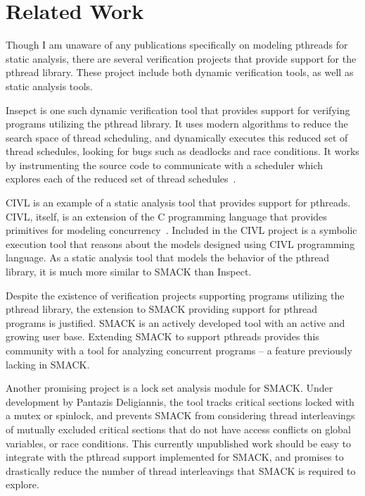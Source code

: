 \chapter{Related Work}\label{thesis_relatedwork}
Though I am unaware of any publications specifically on modeling
pthreads for static analysis, there are several verification projects
that provide support for the pthread library.  These project include
both dynamic verification tools, as well as static analysis tools.

Insepct is one such dynamic verification tool that provides support
for verifying programs utilizing the pthread library.  It uses modern 
algorithms to reduce the search space of thread scheduling, and
dynamically executes this reduced set of thread schedules, looking for
bugs such as deadlocks and race conditions.  It works by instrumenting
the source code to communicate with a scheduler which explores each of
the reduced set of thread schedules~\cite{inspect}.

CIVL is an example of a static analysis tool that provides support for
pthreads.  CIVL, itself, is an extension of the C programming
language that provides primitives for modeling
concurrency~\cite{civl}.  Included in the CIVL project is a symbolic
execution tool that reasons about the models designed using CIVL
programming language.  As a static analysis tool that models the
behavior of the pthread library, it is much more similar to SMACK than
Inspect. 

Despite the existence of verification projects supporting programs
utilizing the pthread library, the extension to SMACK providing
support for pthread programs is justified.  SMACK is an actively
developed tool with an active and growing user base.  Extending SMACK
to support pthreads provides this community with a tool for analyzing
concurrent programs -- a feature previously lacking in SMACK.

Another promising project is a lock set analysis module for SMACK.
Under development by Pantazis Deligiannis, the tool tracks critical
sections locked with a mutex or spinlock, and prevents SMACK from
considering thread interleavings of mutually excluded critical
sections that do not have access conflicts on global variables, or
race conditions. This currently unpublished work should be easy to
integrate with the pthread support implemented for SMACK, and promises
to drastically reduce the number of thread interleavings that SMACK is
required to explore.  

